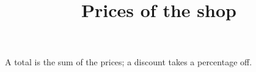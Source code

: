 \documentclass{article}
\title{Prices of the shop}
\begin{document}
\maketitle
A total is the sum of the prices; a discount takes a percentage off.
\end{document}
